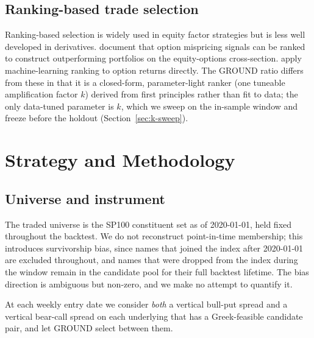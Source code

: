 \documentclass[11pt]{article}
\begin{document}
\subsection{Ranking-based trade selection}

Ranking-based selection is widely used in equity factor strategies
\citep{fama1992,asness2013} but is less well developed in derivatives.
\citet{goyenko2022} document that option mispricing signals can be ranked to
construct outperforming portfolios on the equity-options cross-section.
\citet{cao2023} apply machine-learning ranking to option returns directly.
The GROUND ratio differs from these in that it is a closed-form,
parameter-light ranker (one tuneable amplification factor $k$) derived from
first principles rather than fit to data; the only data-tuned parameter is
$k$, which we sweep on the in-sample window and freeze before the holdout
(Section~\ref{sec:k-sweep}).


\section{Strategy and Methodology}\label{sec:strategy}

\subsection{Universe and instrument}

The traded universe is the SP100 constituent set as of 2020-01-01, held
fixed throughout the backtest. We do not reconstruct point-in-time
membership; this introduces survivorship bias, since names that joined
the index after 2020-01-01 are excluded throughout, and names that
were dropped from the index during the window remain in the candidate
pool for their full backtest lifetime. The bias direction is ambiguous
but non-zero, and we make no attempt to quantify it.

At each weekly entry date we consider \emph{both} a vertical bull-put
spread and a vertical bear-call spread on each underlying that has a
Greek-feasible candidate pair, and let GROUND select between them.
\end{document}
